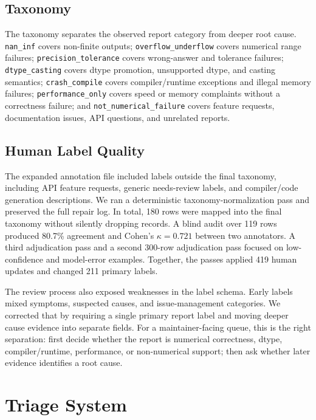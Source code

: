\documentclass[sigplan,10pt]{acmart}
\begin{document}
\subsection{Taxonomy}

The taxonomy separates the observed report category from deeper root cause.
\texttt{nan\_inf} covers non-finite outputs; \texttt{overflow\_underflow}
covers numerical range failures; \texttt{precision\_tolerance} covers
wrong-answer and tolerance failures; \texttt{dtype\_casting} covers dtype
promotion, unsupported dtype, and casting semantics; \texttt{crash\_compile}
covers compiler/runtime exceptions and illegal memory failures;
\texttt{performance\_only} covers speed or memory complaints without a
correctness failure; and \texttt{not\_numerical\_failure} covers feature
requests, documentation issues, API questions, and unrelated reports.

\subsection{Human Label Quality}

The expanded annotation file included labels outside the final taxonomy,
including API feature requests, generic needs-review labels, and compiler/code
generation descriptions. We ran a deterministic taxonomy-normalization pass and
preserved the full repair log. In total, 180 rows were mapped into the final
taxonomy without silently dropping records. A blind audit over 119 rows produced
80.7\% agreement and Cohen's $\kappa=0.721$ between two annotators. A third
adjudication pass and a second 300-row adjudication pass focused on
low-confidence and model-error examples. Together, the passes applied 419 human
updates and changed 211 primary labels.

The review process also exposed weaknesses in the label schema. Early labels
mixed symptoms, suspected causes, and issue-management categories. We corrected
that by requiring a single primary report label and moving deeper cause evidence
into separate fields. For a maintainer-facing queue, this is the right
separation: first decide whether the report is numerical correctness, dtype,
compiler/runtime, performance, or non-numerical support; then ask whether later
evidence identifies a root cause.

\section{Triage System}
\end{document}
